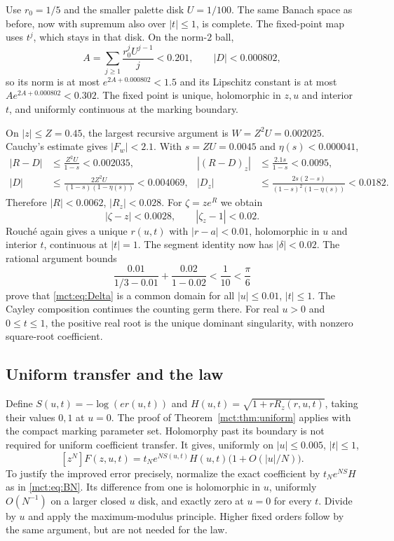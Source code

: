 \documentclass[11pt]{article}
\theoremstyle{definition}
\begin{document}
Use $r_0=1/5$ and the smaller palette disk $U=1/100$. The same Banach space as before, now with supremum also over $|t|\le1$, is complete. The fixed-point map uses $t^j$, which stays in that disk. On the norm-$2$ ball,
\[
 A=\sum_{j\ge1}\frac{r_0^jU^{j-1}}j<0.201,
 \qquad |D|<0.000802,
\]
so its norm is at most $e^{2A+0.000802}<1.5$ and its Lipschitz constant is at most $Ae^{2A+0.000802}<0.302$. The fixed point is unique, holomorphic in $z,u$ and interior $t$, and uniformly continuous at the marking boundary.

On $|z|\le Z=0.45$, the largest recursive argument is $W=Z^2U=0.002025$. Cauchy's estimate gives $|F_w|<2.1$. With $s=ZU=0.0045$ and $\eta(s)<0.000041$,
\begin{align*}
 |R-D|&\le\frac{Z^2U}{1-s}<0.002035,&
 |(R-D)_z|&\le\frac{2.1s}{1-s}<0.0095,\\
 |D|&\le\frac{2Z^2U}{(1-s)(1-\eta(s))}<0.004069,&
 |D_z|&\le\frac{2s(2-s)}{(1-s)^2(1-\eta(s))}<0.0182.
\end{align*}
Therefore $|R|<0.0062$, $|R_z|<0.028$. For $\zeta=ze^R$ we obtain
\[
 |\zeta-z|<0.0028,\qquad |\zeta_z-1|<0.02.
\]
Rouch\'e again gives a unique $r(u,t)$ with $|r-a|<0.01$, holomorphic in $u$ and interior $t$, continuous at $|t|=1$. The segment identity now has $|\delta|<0.02$. The rational argument bounds
\[
 \frac{0.01}{1/3-0.01}+\frac{0.02}{1-0.02}<\frac1{10}<\frac\pi6
\]
prove that \eqref{mct:eq:Delta} is a common domain for all $|u|\le0.01$, $|t|\le1$. The Cayley composition continues the counting germ there. For real $u>0$ and $0\le t\le1$, the positive real root is the unique dominant singularity, with nonzero square-root coefficient.

\subsection{Uniform transfer and the law}
Define $S(u,t)=-\log(er(u,t))$ and $H(u,t)=\sqrt{1+rR_z(r,u,t)}$, taking their values $0,1$ at $u=0$. The proof of Theorem~\ref{mct:thm:uniform} applies with the compact marking parameter set. Holomorphy past its boundary is not required for uniform coefficient transfer. It gives, uniformly on $|u|\le0.005$, $|t|\le1$,
\begin{equation}\label{mct:eq:markedtransfer}
 [z^N]F(z,u,t)=t_N e^{NS(u,t)}H(u,t)\bigl(1+O(|u|/N)\bigr).
\end{equation}
To justify the improved error precisely, normalize the exact coefficient by $t_Ne^{NS}H$ as in \eqref{mct:eq:BN}. Its difference from one is holomorphic in $u$, uniformly $O(N^{-1})$ on a larger closed $u$ disk, and exactly zero at $u=0$ for every $t$. Divide by $u$ and apply the maximum-modulus principle. Higher fixed orders follow by the same argument, but are not needed for the law.
\end{document}
